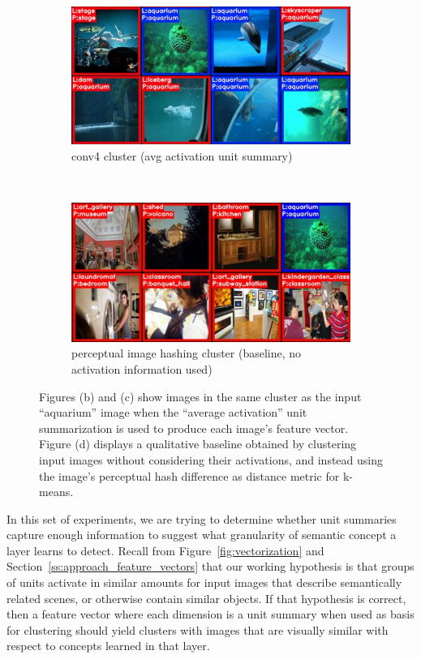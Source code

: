 \begin{figure}[!htb]
\begin{subfigure}[b]{.99\linewidth}
    \centering
    \includegraphics[width=.99\textwidth]{figures/clustering/aquarium_conv4_avg}
    \caption{conv4 cluster (avg activation unit summary)}\label{fig:clustering_aquarium_conv4}
  \end{subfigure}  \\%
  \begin{subfigure}[b]{.99\linewidth}
    \centering
    \includegraphics[width=.99\textwidth]{figures/clustering/aquarium_dhash}
    \caption{perceptual image hashing cluster (baseline, no activation information used)}\label{fig:clustering_baseline}
  \end{subfigure}%
  \caption{Figures (b) and (c) show images in the same cluster as the input ``aquarium'' image when the ``average activation'' unit summarization is used to produce each image's feature vector.  Figure (d) displays a qualitative baseline obtained by clustering input images without considering their activations, and instead using the image's perceptual hash difference as distance metric for k-means.}
  \label{fig:aquarium_clusters}
\end{figure}

In this set of experiments, we are trying to determine whether unit summaries capture enough information to suggest what granularity of semantic concept a layer learns to detect.  Recall from Figure~\ref{fig:vectorization} and Section~\ref{ss:approach_feature_vectors} that our working hypothesis is that groups of units activate in similar amounts for input images that describe semantically related scenes, or otherwise contain similar objects.  If that hypothesis is correct, then a feature vector where each dimension is a unit summary when used as basis for clustering should yield clusters with images that are visually similar with respect to concepts learned in that layer.

